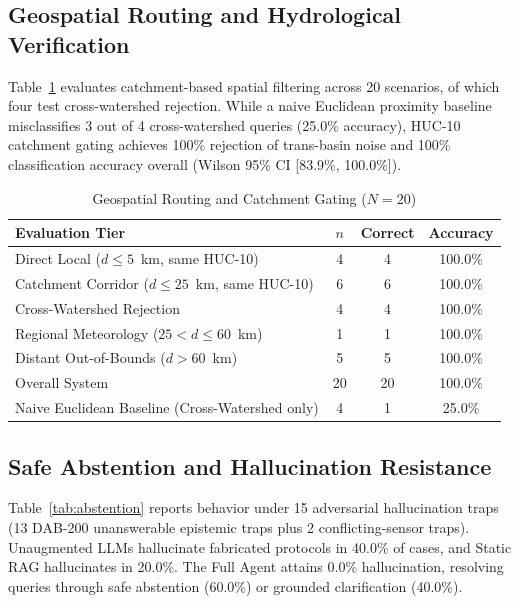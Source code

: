 \documentclass[conference]{IEEEtran}
\begin{document}
\subsection{Geospatial Routing and Hydrological Verification}
Table~\ref{tab:geo} evaluates catchment-based spatial filtering across 20 scenarios, of which four test cross-watershed rejection. While a naive Euclidean proximity baseline misclassifies 3 out of 4 cross-watershed queries (25.0\% accuracy), HUC-10 catchment gating achieves 100\% rejection of trans-basin noise and 100\% classification accuracy overall (Wilson 95\% CI [83.9\%, 100.0\%]).

\begin{table}[ht]
\caption{Geospatial Routing and Catchment Gating ($N=20$)}
\label{tab:geo}
\centering
\scriptsize
\setlength{\tabcolsep}{2.5pt}
\begin{tabular*}{\columnwidth}{@{\extracolsep{\fill}}lccc@{}}
\toprule
Evaluation Tier & $n$ & Correct & Accuracy \\
\midrule
Direct Local ($d \le 5$~km, same HUC-10) & 4 & 4 & 100.0\% \\
Catchment Corridor ($d \le 25$~km, same HUC-10) & 6 & 6 & 100.0\% \\
Cross-Watershed Rejection & 4 & 4 & 100.0\% \\
Regional Meteorology ($25 < d \le 60$~km) & 1 & 1 & 100.0\% \\
Distant Out-of-Bounds ($d > 60$~km) & 5 & 5 & 100.0\% \\
\midrule
Overall System & 20 & 20 & 100.0\% \\
Naive Euclidean Baseline (Cross-Watershed only) & 4 & 1 & 25.0\% \\
\bottomrule
\end{tabular*}
\end{table}

\subsection{Safe Abstention and Hallucination Resistance}
Table~\ref{tab:abstention} reports behavior under 15 adversarial hallucination traps (13 DAB-200 unanswerable epistemic traps plus 2 conflicting-sensor traps). Unaugmented LLMs hallucinate fabricated protocols in 40.0\% of cases, and Static RAG hallucinates in 20.0\%. The Full Agent attains 0.0\% hallucination, resolving queries through safe abstention (60.0\%) or grounded clarification (40.0\%).
\end{document}
